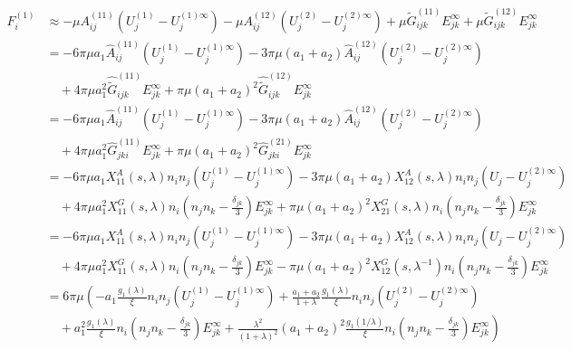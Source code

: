 \documentclass[12pt]{article}
\begin{document}
\begin{align*}
F^{(1)}_i
&\approx 
- \mu A^{(11)}_{ij}
(U_{j}^{(1)}-U_{j}^{(1)\infty})
- \mu A^{(12)}_{ij}
(U_{j}^{(2)}-U_{j}^{(2)\infty})
+ \mu \tilde{G}^{(11)}_{ijk} E^{\infty}_{jk}
+ \mu \tilde{G}^{(12)}_{ijk} E^{\infty}_{jk} \\
&=
- 6 \pi\mu a_{1} \hat{A}^{(11)}_{ij}(U_{j}^{(1)}-U_{j}^{(1)\infty})
- 3 \pi\mu (a_{1}+a_{2})\hat{A}^{(12)}_{ij} (U_{j}^{(2)}-U_{j}^{(2)\infty})\\
&\quad
+ 4 \pi\mu a_{1}^2 \hat{\tilde{G}}^{(11)}_{ijk} E^{\infty}_{jk}
+ \pi\mu (a_{1}+a_{2})^2 \hat{\tilde{G}}^{(12)}_{ijk} E^{\infty}_{jk} \\
&=
- 6 \pi\mu a_{1} \hat{A}^{(11)}_{ij}
(U_{j}^{(1)}-U_{j}^{(1)\infty})
- 3 \pi\mu (a_{1}+a_{2})\hat{A}^{(12)}_{ij}
(U_{j}^{(2)}-U_{j}^{(2)\infty}) \\
&\quad
+ 4 \pi\mu a_{1}^2 \hat{G}^{(11)}_{jki} E^{\infty}_{jk}
+  \pi\mu (a_{1}+a_{2})^2 \hat{G}^{(21)}_{jki} E^{\infty}_{jk} \\
&=
- 6 \pi\mu a_{1} X_{11}^{A}(s,\lambda) n_i n_j
(U_{j}^{(1)}-U_{j}^{(1)\infty})
- 3 \pi\mu (a_{1}+a_{2}) X_{12}^{A}(s,\lambda) n_i n_j
(U_{j}-U_{j}^{(2)\infty}) \\
&\quad
+ 4 \pi\mu a_{1}^2 X_{11}^{G}(s,\lambda) 
n_i\left(n_j n_k - \frac{\delta_{jk}}{3}  \right) E^{\infty}_{jk}
+  \pi\mu (a_{1}+a_{2})^2
X_{21}^{G}(s,\lambda) 
n_i\left(n_j n_k - 
\frac{\delta_{jk}}{3} \right) E^{\infty}_{jk} \\
&=
- 6 \pi\mu a_{1} X_{11}^{A}(s,\lambda) n_i n_j
(U_{j}^{(1)}-U_{j}^{(1)\infty})
- 3 \pi\mu (a_{1}+a_{2}) X_{12}^{A}(s,\lambda) n_i n_j
(U_{j}-U_{j}^{(2)\infty}) \\
&\quad
+ 4 \pi\mu a_{1}^2 X_{11}^{G} (s,\lambda)
n_i\left(n_j n_k - \frac{\delta_{jk}}{3}  \right) E^{\infty}_{jk}
-  \pi\mu (a_{1}+a_{2})^2 X_{12}^{G}(s,\lambda^{-1})
n_i\left(n_j n_k - 
\frac{\delta_{jk}}{3} \right) E^{\infty}_{jk} \\
&=
6 \pi\mu
\left(
-  a_{1} \frac{g_1(\lambda)}{\xi} n_i n_j
(U_{j}^{(1)}-U_{j}^{(1)\infty})
+ \frac{a_{1}+a_{2}}{1+\lambda} \frac{g_1(\lambda)}{\xi} n_i n_j
(U_{j}^{(2)}-U_{j}^{(2)\infty})\right.
\\
&\quad + 
\left.
 a_{1}^2 \frac{g_1(\lambda)}{\xi} 
n_i\left(n_j n_k - \frac{\delta_{jk}}{3} \right) E^{\infty}_{jk}
+  
\frac{  \lambda^2}{(1+\lambda)^2} 
 (a_{1}+ a_{2})^2
\frac{g_1(1/\lambda)}{\xi} n_i\left(n_j n_k 
- \frac{\delta_{jk}}{3} \right)E^{\infty}_{jk} 
\right)
\end{align*}
\end{document}
